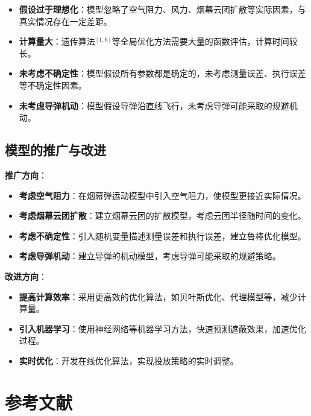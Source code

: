 \documentclass[12pt,a4paper]{article}
\begin{document}
\begin{itemize}
\item \textbf{假设过于理想化}：模型忽略了空气阻力、风力、烟幕云团扩散等实际因素，与真实情况存在一定差距。

\item \textbf{计算量大}：遗传算法$^{[1,6]}$等全局优化方法需要大量的函数评估，计算时间较长。

\item \textbf{未考虑不确定性}：模型假设所有参数都是确定的，未考虑测量误差、执行误差等不确定性因素。

\item \textbf{未考虑导弹机动}：模型假设导弹沿直线飞行，未考虑导弹可能采取的规避机动。
\end{itemize}

\subsection{模型的推广与改进}

\noindent\textbf{推广方向}：

\begin{itemize}
\item \textbf{考虑空气阻力}：在烟幕弹运动模型中引入空气阻力，使模型更接近实际情况。

\item \textbf{考虑烟幕云团扩散}：建立烟幕云团的扩散模型，考虑云团半径随时间的变化。

\item \textbf{考虑不确定性}：引入随机变量描述测量误差和执行误差，建立鲁棒优化模型。

\item \textbf{考虑导弹机动}：建立导弹的机动模型，考虑导弹可能采取的规避策略。
\end{itemize}

\noindent\textbf{改进方向}：

\begin{itemize}
\item \textbf{提高计算效率}：采用更高效的优化算法，如贝叶斯优化、代理模型等，减少计算量。

\item \textbf{引入机器学习}：使用神经网络等机器学习方法，快速预测遮蔽效果，加速优化过程。

\item \textbf{实时优化}：开发在线优化算法，实现投放策略的实时调整。


\end{itemize}

\section*{参考文献}
\end{document}
